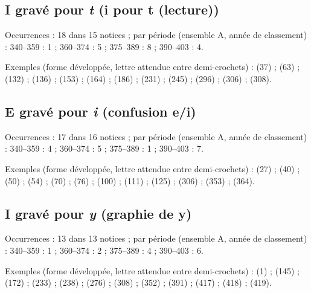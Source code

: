 \subsection*{I gravé pour \textit{t} (i pour t (lecture))}
\noindent Occurrences : 18 dans 15 notices ; par période (ensemble A, année de classement) : 340–359 : 1 ; 360–374 : 5 ; 375–389 : 8 ; 390–403 : 4.\par
\noindent Exemples (forme développée, lettre attendue entre demi-crochets) :  (37) ;  (63) ;  (132) ;  (136) ;  (153) ;  (164) ;  (186) ;  (231) ;  (245) ;  (296) ;  (306) ;  (308).\par
{}\par\medskip
\subsection*{E gravé pour \textit{i} (confusion e/i)}
\noindent Occurrences : 17 dans 16 notices ; par période (ensemble A, année de classement) : 340–359 : 4 ; 360–374 : 5 ; 375–389 : 1 ; 390–403 : 7.\par
\noindent Exemples (forme développée, lettre attendue entre demi-crochets) :  (27) ;  (40) ;  (50) ;  (54) ;  (70) ;  (76) ;  (100) ;  (111) ;  (125) ;  (306) ;  (353) ;  (364).\par
{}\par\medskip
\subsection*{I gravé pour \textit{y} (graphie de y)}
\noindent Occurrences : 13 dans 13 notices ; par période (ensemble A, année de classement) : 340–359 : 1 ; 360–374 : 2 ; 375–389 : 4 ; 390–403 : 6.\par
\noindent Exemples (forme développée, lettre attendue entre demi-crochets) :  (1) ;  (145) ;  (172) ;  (233) ;  (238) ;  (276) ;  (308) ;  (352) ;  (391) ;  (417) ;  (418) ;  (419).\par
{}\par\medskip
